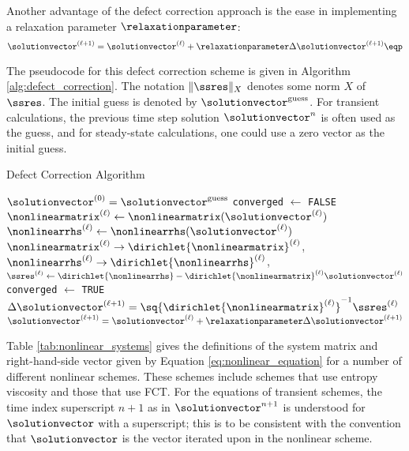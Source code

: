 Another advantage of the defect correction approach is the ease in implementing
a relaxation parameter $\relaxationparameter$:
\begin{equation}
  \solutionvector^{(\ell+1)} = \solutionvector^{(\ell)}
    + \relaxationparameter\Delta\solutionvector^{(\ell+1)} \eqp
\end{equation}

The pseudocode for this defect correction scheme is given in Algorithm
\ref{alg:defect_correction}.
The notation $\|\ssres\|_X$ denotes some norm $X$ of $\ssres$.
The initial guess is denoted by $\solutionvector^{\text{guess}}$. For
transient calculations, the previous time step solution $\solutionvector^n$
is often used as the guess, and for steady-state calculations, one
could use a zero vector as the initial guess.

\begin{algorithm}[H]
\caption{Defect Correction Algorithm}
\label{alg:defect_correction}
\begin{algorithmic}
\State $\solutionvector^{(0)} = \solutionvector^{\text{guess}}$
\State \texttt{converged} $\gets$ \texttt{FALSE}
  \State $\nonlinearmatrix^{(\ell)} \gets
    \nonlinearmatrix(\solutionvector^{(\ell)})$
  \State $\nonlinearrhs^{(\ell)} \gets
    \nonlinearrhs(\solutionvector^{(\ell)})$
  \State $\nonlinearmatrix^{(\ell)} \rightarrow \dirichlet{\nonlinearmatrix}^{(\ell)}$,
    $\nonlinearrhs^{(\ell)} \rightarrow \dirichlet{\nonlinearrhs}^{(\ell)}$,
  \State $\ssres^{(\ell)} \gets \dirichlet{\nonlinearrhs}
    - \dirichlet{\nonlinearmatrix}^{(\ell)}\solutionvector^{(\ell)}$
    \State \texttt{converged} $\gets$ \texttt{TRUE}
    \Break
  \EndIf
  \State $\Delta\solutionvector^{(\ell+1)}
    = \sq{\dirichlet{\nonlinearmatrix}^{(\ell)}}^{-1}\ssres^{(\ell)}$
  \State $\solutionvector^{(\ell+1)} = \solutionvector^{(\ell)}
    + \relaxationparameter\Delta\solutionvector^{(\ell+1)}$
\EndFor
{}
\EndIf
\end{algorithmic}
\end{algorithm}

Table \ref{tab:nonlinear_systems} gives the definitions of the system matrix
and right-hand-side vector given by Equation \eqref{eq:nonlinear_equation}
for a number of different nonlinear schemes. These schemes include schemes
that use entropy viscosity and those that use FCT. For the equations of
transient schemes, the time index superscript $n+1$ as in $\solutionvector^{n+1}$
is understood for $\solutionvector$ with a superscript; this is to be consistent
with the convention that $\solutionvector$ is the vector iterated upon in
the nonlinear scheme.

